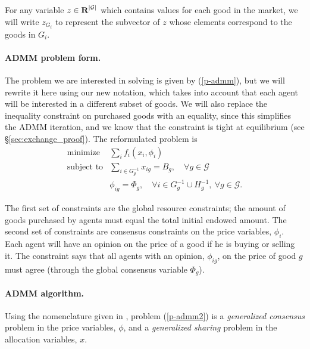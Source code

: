 \documentclass[12pt]{article}
\begin{document}
For any variable $z \in {\mbox{\bf R}}^{|\mathcal{G}|}$ which contains values for
each good in the market, we will write $z_{G_i}$ to represent the subvector
of $z$ whose elements correspond to the goods in $G_i$.

\paragraph{ADMM problem form.}

The problem we are interested in solving is given by (\ref{p-admm}), but we
will rewrite it here using our new notation, which takes into account that each
agent will be interested in a different subset of goods. We will also replace
the inequality constraint on purchased goods with an equality, since this
simplifies the ADMM iteration, and we know that the constraint is tight at
equilibrium (see \S\ref{sec:exchange_proof}). The reformulated problem is
\begin{equation}
\begin{array}{ll}
\mbox{minimize} & \sum_i f_i(x_i, \phi_i) \\
\mbox{subject to} & \sum\limits_{i \in G^{-1}_g} x_{ig} = B_g,\quad \forall g \in \mathcal{G}\\
& \phi_{ig} = \Phi_g,\quad \forall i \in G^{-1}_g \cup H^{-1}_g,\ \forall g \in \mathcal{G}.
\end{array}
\label{p-admm2}
\end{equation}

The first set of constraints are the global resource constraints; the amount of
goods purchased by agents must equal the total initial endowed amount. The
second set of constraints are consensus constraints on the price variables,
$\phi_i$. Each agent will have an opinion on the price of a good if he is
buying or selling it. The constraint says that all agents with an opinion,
$\phi_{ig}$, on the price of good $g$ must agree (through the global
consensus variable $\Phi_g$).


\paragraph{ADMM algorithm.}

Using the nomenclature given in \cite{boyd2011distributed}, problem
(\ref{p-admm2}) is a \emph{generalized consensus} problem in the price variables,
$\phi$, and a \emph{generalized sharing} problem in the allocation variables, $x$.
\end{document}
